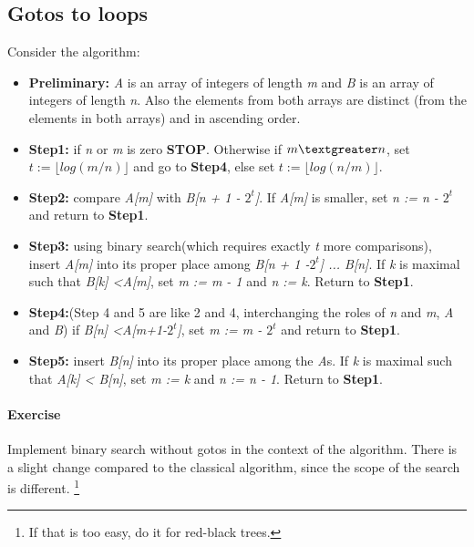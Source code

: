 \documentclass{article}
\newcommand{\percents}[1]{\protect \marginpar[l]{\bf [#1]}}
\newcounter{question}
\newcommand{\question}[1]{
  \addtocounter{question}{1}
  \paragraph{Exercise~\arabic{question}  \percents{#1}}
 }
\begin{document}
\subsection{Gotos to loops}

Consider the algorithm:

\begin{itemize}
\item \textbf {Preliminary:} {\it A} is an array of integers of length
  {\it m} and {\it B} is an array of integers of length {\it n}. Also
  the elements from both arrays are distinct (from the elements in
  both arrays) and in ascending order.

\item \textbf{Step1:} if {\it n} or {\it m} is zero
  \textbf{STOP}. Otherwise if  $m\textgreater n$, set $t := \lfloor log
    \left ( m \slash n \right ) \rfloor $  and go to \textbf{Step4},
    else set $t := \lfloor log
    \left ( n \slash m \right ) \rfloor $.

\item \textbf{Step2:} compare {\it A[m]} with {\it B[n + 1 -
    $2^t$]}. If {\it A[m]} is smaller, set {\it n := n - $2^t$} and
  return to \textbf{Step1}.

\item \textbf{Step3:} using binary search(which requires exactly {\it
    t} more comparisons), insert {\it A[m]} into its proper place
  among {\it B[n + 1 -$2^t$] ... B[n]}. If {\it k} is maximal such
  that {\it B[k] \textless A[m]}, set {\it m := m - 1} and {\it n :=
    k}. Return to \textbf{Step1}.

\item \textbf{Step4:}(Step 4 and 5 are like 2 and 4, interchanging the
  roles of {\it n} and {\it m}, {\it A} and {\it B}) if {\it B[n]
    \textless A[m+1-$2^t$]}, set {\it m := m - $2^t$} and return to
  \textbf{Step1}.

\item \textbf{Step5:} insert {\it B[n]} into its proper place among
  the {\it A}s. If {\it k} is maximal such that {\it A[k] \textless
    B[n]}, set {\it m := k} and {\it n := n - 1}. Return to \textbf{Step1}.


\end{itemize}


\question{*}

Implement binary search without gotos in the context of the
algorithm. There is a slight change compared to the classical
algorithm, since the scope of the search is different. %
\footnote{If that is too easy, do it for red-black trees.}
\end{document}
